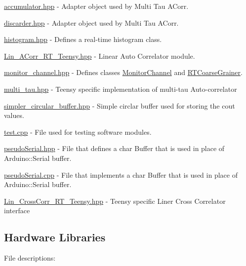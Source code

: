 \begin{DoxyItemize}
\item {\ttfamily \hyperlink{accumulator_8hpp}{accumulator.\+hpp}} -\/ Adapter object used by Multi Tau A\+Corr.
\item {\ttfamily \hyperlink{discarder_8hpp}{discarder.\+hpp}} -\/ Adapter object used by Multi Tau A\+Corr.
\item {\ttfamily \hyperlink{histogram_8hpp}{histogram.\+hpp}} -\/ Defines a real-\/time histogram class.
\item {\ttfamily \hyperlink{Lin__ACorr__RT__Teensy_8hpp}{Lin\+\_\+\+A\+Corr\+\_\+\+R\+T\+\_\+\+Teensy.\+hpp}} -\/ Linear Auto Correlator module.
\item {\ttfamily \hyperlink{monitor__channel_8hpp}{monitor\+\_\+channel.\+hpp}} -\/ Defines classes {\ttfamily \hyperlink{classMonitorChannel}{Monitor\+Channel}} and {\ttfamily \hyperlink{classRTCoarseGrainer}{R\+T\+Coarse\+Grainer}}.
\item {\ttfamily \hyperlink{multi__tau_8hpp}{multi\+\_\+tau.\+hpp}} -\/ Teensy specific implementation of multi-\/tau Auto-\/correlator
\item {\ttfamily \hyperlink{simpler__circular__buffer_8hpp}{simpler\+\_\+circular\+\_\+buffer.\+hpp}} -\/ Simple circlar buffer used for storing the cout values. 


\item {\ttfamily \hyperlink{test_8cpp}{test.\+cpp}} -\/ File used for testing software modules.
\item {\ttfamily \hyperlink{pseudoSerial_8hpp}{pseudo\+Serial.\+hpp}} -\/ File that defines a {\ttfamily char Buffer} that is used in place of {\ttfamily Arduino\+::\+Serial} buffer.
\item {\ttfamily \hyperlink{pseudoSerial_8cpp}{pseudo\+Serial.\+cpp}} -\/ File that implements a {\ttfamily char Buffer} that is used in place of {\ttfamily Arduino\+::\+Serial} buffer. 


\item {\ttfamily \hyperlink{Lin__CrossCorr__RT__Teensy_8hpp}{Lin\+\_\+\+Cross\+Corr\+\_\+\+R\+T\+\_\+\+Teensy.\+hpp}} -\/ Teensy specific Liner Cross Correlator interface
\end{DoxyItemize}

\subsection*{Hardware Libraries}

File descriptions\+:


